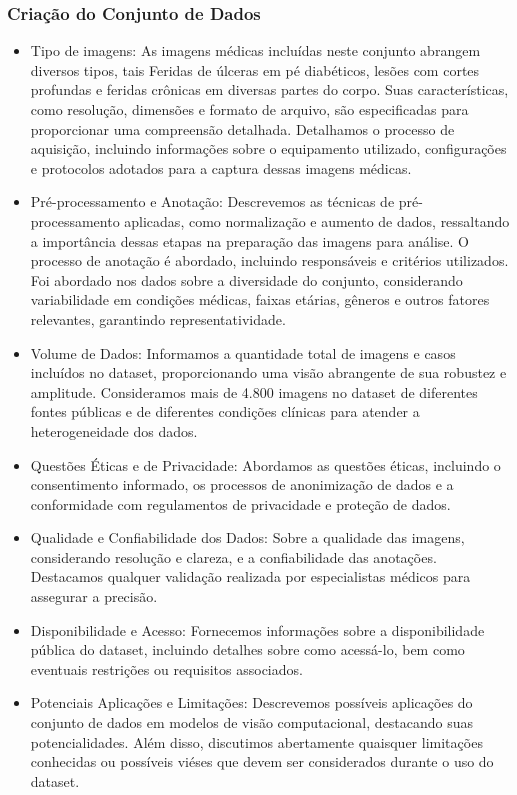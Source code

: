    \subsubsection{Criação do Conjunto de Dados}
        
        \begin{itemize}
            \item Tipo de imagens: As imagens médicas incluídas neste conjunto abrangem diversos tipos, tais Feridas de úlceras em pé diabéticos, lesões com cortes profundas e feridas crônicas em diversas partes do corpo. Suas características, como resolução, dimensões e formato de arquivo, são especificadas para proporcionar uma compreensão detalhada. Detalhamos o processo de aquisição, incluindo informações sobre o equipamento utilizado, configurações e protocolos adotados para a captura dessas imagens médicas.
        
            \item Pré-processamento e Anotação: Descrevemos as técnicas de pré-processamento aplicadas, como normalização e aumento de dados, ressaltando a importância dessas etapas na preparação das imagens para análise. O processo de anotação é abordado, incluindo responsáveis e critérios utilizados. Foi abordado nos dados sobre a diversidade do conjunto, considerando variabilidade em condições médicas, faixas etárias, gêneros e outros fatores relevantes, garantindo representatividade.
        
            \item Volume de Dados: Informamos a quantidade total de imagens e casos incluídos no dataset, proporcionando uma visão abrangente de sua robustez e amplitude. Consideramos mais de 4.800 imagens no dataset de diferentes fontes públicas e de diferentes condições clínicas para atender a heterogeneidade dos dados.
        
            \item Questões Éticas e de Privacidade: Abordamos as questões éticas, incluindo o consentimento informado, os processos de anonimização de dados e a conformidade com regulamentos de privacidade e proteção de dados.
    
            \item Qualidade e Confiabilidade dos Dados: Sobre a qualidade das imagens, considerando resolução e clareza, e a confiabilidade das anotações. Destacamos qualquer validação realizada por especialistas médicos para assegurar a precisão.
    
            \item Disponibilidade e Acesso: Fornecemos informações sobre a disponibilidade pública do dataset, incluindo detalhes sobre como acessá-lo, bem como eventuais restrições ou requisitos associados.
    
            \item Potenciais Aplicações e Limitações: Descrevemos possíveis aplicações do conjunto de dados em modelos de visão computacional, destacando suas potencialidades. Além disso, discutimos abertamente quaisquer limitações conhecidas ou possíveis viéses que devem ser considerados durante o uso do dataset.
    
            
        \end{itemize}

